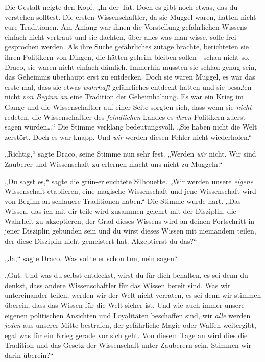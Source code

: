 {Die Gestalt neigte den Kopf. „In der Tat. Doch es gibt noch etwas, das du verstehen solltest. Die ersten Wissenschaftler, da sie Muggel waren, hatten nicht eure Traditionen. Am Anfang war ihnen die Vorstellung gefährlichen Wissens einfach nicht vertraut und sie dachten, über alles was man wisse, solle frei gesprochen werden. Als ihre Suche gefährliches zutage brachte, berichteten sie ihren Politikern von Dingen, die hätten geheim bleiben sollen - schau nicht so, Draco, sie waren nicht einfach dämlich. Immerhin mussten sie schlau genug sein, das Geheimnis überhaupt erst zu entdecken. Doch sie waren Muggel, es war das erste mal, dass sie etwas \emph{wahrhaft} gefährliches entdeckt hatten und sie besaßen nicht \emph{von Beginn an} eine Tradition der Geheimhaltung. Es war ein Krieg im Gange und die Wissenschaftler auf einer Seite sorgten sich, dass wenn sie \emph{nicht} redeten, die Wissenschaftler des \emph{feindlichen} Landes es \emph{ihren} Politikern zuerst sagen würden…“ Die Stimme verklang bedeutungsvoll. „Sie haben nicht die Welt zerstört. Doch es war knapp. Und \emph{wir} werden diesen Fehler nicht wiederholen.“

„Richtig,“ sagte Draco, seine Stimme nun sehr fest. „Werden \emph{wir} nicht. Wir sind Zauberer und Wissenschaft zu erlernen macht uns nicht zu Muggeln.“

„Du sagst es,“ sagte die grün-erleuchtete Silhouette. „Wir werden unsere \emph{eigene} Wissenschaft etablieren, eine magische Wissenschaft und jene Wissenschaft wird von Beginn an schlauere Traditionen haben.“ Die Stimme wurde hart. „Das Wissen, das ich mit dir teile wird zusammen gelehrt mit der Disziplin, die Wahrheit zu akzeptieren, der Grad dieses Wissens wird an deinen Fortschritt in jener Disziplin gebunden sein und du wirst dieses Wissen mit niemandem teilen, der diese Disziplin nicht gemeistert hat. Akzeptierst du das?“

„Ja,“ sagte Draco. Was sollte er schon tun, nein sagen?

„Gut. Und was du selbst entdeckst, wirst du für dich behalten, es sei denn du denkst, dass andere Wissenschaftler für das Wissen bereit sind. Was wir untereinander teilen, werden wir der Welt nicht verraten, es sei denn wir stimmen überein, dass das Wissen für die Welt sicher ist. Und wie auch immer unsere eigenen politischen Ansichten und Loyalitäten beschaffen sind, wir \emph{alle} werden \emph{jeden} aus unserer Mitte bestrafen, der gefährliche Magie oder Waffen weitergibt, egal was für ein Krieg gerade vor sich geht. Von diesem Tage an wird dies die Tradition und das Gesetz der Wissenschaft unter Zauberern sein. Stimmen wir darin überein?“

}
